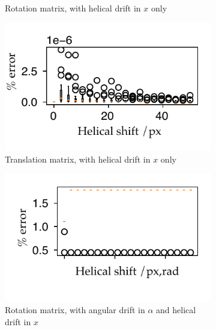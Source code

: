 \begin{figure}
\begin{subfigure}[t]{0.5\textwidth}
          \caption{Rotation matrix, with helical drift in \(x\) only}\label{fig:pc_sum_rot_tx}
        \end{subfigure}\hfill
        \begin{subfigure}[t]{0.5\textwidth}
          \captionsetup{width=0.8\textwidth}
          \centering
          \includegraphics{Chapters/flopt/Figs/PDF/results/helix/decompose/pc_sum_trans_tx}
          \caption{Translation matrix, with helical drift in \(x\) only}\label{fig:pc_sum_trans_tx}
        \end{subfigure}
    \bigskip
        \begin{subfigure}[t]{0.5\textwidth}
          \captionsetup{width=0.8\textwidth}
          \centering
          \includegraphics{Chapters/flopt/Figs/PDF/results/helix/decompose/pc_sum_rot_both}
          \caption{Rotation matrix, with angular drift in \(\alpha \) and helical drift in \(x\)}\label{fig:pc_sum_rot_both}
        \end{subfigure}\hfill
        \begin{subfigure}[t]{0.5\textwidth}
          \captionsetup{width=0.8\textwidth}
          \centering

\end{subfigure}
\end{figure}
